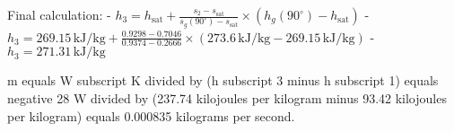 Final calculation:
- \( h_3 = h_{\text{sat}} + \frac{s_2 - s_{\text{sat}}}{s_g(90^\circ) - s_{\text{sat}}} \times (h_g(90^\circ) - h_{\text{sat}}) \)
- \( h_3 = 269.15 \, \text{kJ/kg} + \frac{0.9298 - 0.7046}{0.9374 - 0.2666} \times (273.6 \, \text{kJ/kg} - 269.15 \, \text{kJ/kg}) \)
- \( h_3 = 271.31 \, \text{kJ/kg} \)

m equals W subscript K divided by (h subscript 3 minus h subscript 1) equals negative 28 W divided by (237.74 kilojoules per kilogram minus 93.42 kilojoules per kilogram) equals 0.000835 kilograms per second.